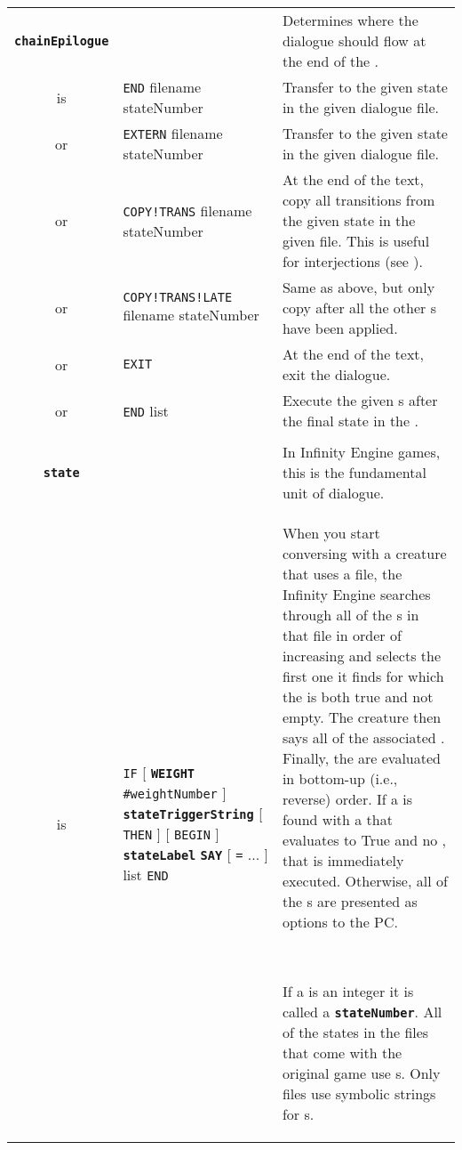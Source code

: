 \documentclass{article}
\def\ttref#1{\ahrefloc{#1}{\tt #1}}
\def\DEFINE#1{{\tt \bf #1}\label{#1}\index{#1}}
\def\t#1{{\tt #1}}
\def\Slist{{\color{red} list }}
\def\Ob{{\color{red} [ }}
\def\Oe{{\color{red} ] }}
\begin{document}
\begin{tabular}{cp{10in}|p{10in}}
\\

\DEFINE{chainEpilogue} & & Determines where the dialogue should flow at the
end of the \ttref{CHAIN}. \\
is & {\tt END} filename stateNumber & Transfer to the given state in the given dialogue file. \\
or & {\tt EXTERN} filename stateNumber & Transfer to the given state in the given dialogue file. \\
or & {\tt COPY!TRANS} filename stateNumber & At the end of the
\ttref{CHAIN} text, copy all transitions from the given state in the
given file. This is useful for interjections (see \ttref{INTERJECT}).  \\
or & {\tt COPY!TRANS!LATE} filename stateNumber & Same as above, but only copy after all the other \ttref{D Action}s have been applied. \\
or & {\tt EXIT} & At the end of the \ttref{CHAIN} text, exit the dialogue.\\
or & {\tt END} \ttref{transition} \Slist & Execute the given \ttref{transition}s
after the final state in the \ttref{CHAIN}. \\

\\

\DEFINE{state} & & In Infinity Engine games, this is the fundamental unit
of dialogue. \\
is & {\tt IF} \Ob \DEFINE{WEIGHT} \t{\#weightNumber} \Oe \DEFINE{stateTriggerString} \Ob {\tt THEN} \Oe
  \Ob {\tt BEGIN} \Oe \DEFINE{stateLabel} \DEFINE{SAY} \ttref{sayText} \Ob \t{=}
  \ttref{sayText} ... \Oe \ttref{transition} \Slist \t{END} &
  When you start conversing with a creature that uses a \ttref{DLG} file, the
  Infinity Engine searches through all of the \ttref{state}s in that file
  in order of increasing \ttref{WEIGHT} and selects the first one it finds
  for which the \ttref{stateTriggerString} is both true and not empty.
  The creature then says all of the associated \ttref{sayText}. Finally,
  the \ttref{transitions} are evaluated in bottom-up (i.e., reverse) order.
  If a \ttref{transition} is found with a \ttref{transTriggerString} that
  evaluates to True and no \ttref{replyText}, that \ttref{transition} is
  immediately executed. Otherwise, all of the \ttref{transition}s are
  presented as options to the PC.

  \

  If a \ttref{stateLabel} is an integer it is called a
  \DEFINE{stateNumber}. All of the states in the \ttref{DLG} files that
  come with the original game use \ttref{stateNumber}s. Only \ttref{D}
  files use symbolic strings for \ttref{stateLabel}s.


\end{tabular}
\end{document}
